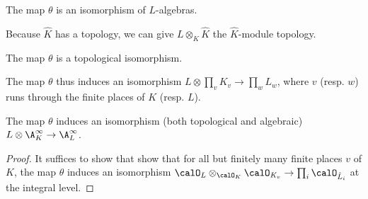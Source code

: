 \begin{theorem}
  The map $\theta$ is an isomorphism of $L$-algebras.
\end{theorem}

Because $\hat{K}$ has a topology, we can give $L\otimes_K\hat{K}$ the $\hat{K}$-module topology.

\begin{theorem}
  The map $\theta$ is a topological isomorphism.
\end{theorem}

The map $\theta$ thus induces an isomorphism $L\otimes\prod_vK_v\to \prod_wL_w$, where $v$
(resp. $w$) runs through the finite places of $K$ (resp. $L$).

\begin{theorem}
  The map $\theta$ induces an isomorphism (both topological and algebraic)
  $L\otimes\A_K^\infty\to\A_L^\infty$.
\end{theorem}
\begin{proof}
  It suffices to show that show that for all but finitely many finite places $v$ of $K$, the map
  $\theta$ induces an isomorphism $\calO_L\otimes_{\calO_K}\calO_{K_v}\to\prod_i\calO_{\hat{L}_i}$
  at the integral level.
\end{proof}
